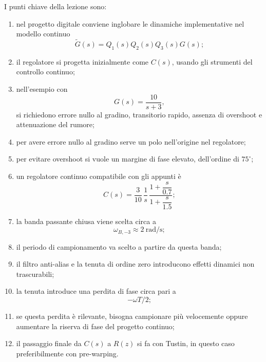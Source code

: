 I punti chiave della lezione sono:
\begin{enumerate}
    \item nel progetto digitale conviene inglobare le dinamiche implementative nel modello continuo
    \[
    \tilde G(s)=Q_1(s)Q_2(s)Q_3(s)G(s);
    \]
    \item il regolatore si progetta inizialmente come \(C(s)\), usando gli strumenti del controllo continuo;
    \item nell'esempio con
    \[
    G(s)=\frac{10}{s+3},
    \]
    si richiedono errore nullo al gradino, transitorio rapido, assenza di overshoot e attenuazione del rumore;
    \item per avere errore nullo al gradino serve un polo nell'origine nel regolatore;
    \item per evitare overshoot si vuole un margine di fase elevato, dell'ordine di \(75^\circ\);
    \item un regolatore continuo compatibile con gli appunti \`e
    \[
    C(s)=\frac{3}{10}\,\frac{1}{s}\,
    \frac{1+\dfrac{s}{0.7}}{1+\dfrac{s}{1.5}};
    \]
    \item la banda passante chiusa viene scelta circa a
    \[
    \omega_{B,-3}\approx 2\ \text{rad/s};
    \]
    \item il periodo di campionamento va scelto a partire da questa banda;
    \item il filtro anti-alias e la tenuta di ordine zero introducono effetti dinamici non trascurabili;
    \item la tenuta introduce una perdita di fase circa pari a
    \[
    -\omega T/2;
    \]
    \item se questa perdita \`e rilevante, bisogna campionare pi\`u velocemente oppure aumentare la riserva di fase del progetto continuo;
    \item il passaggio finale da \(C(s)\) a \(R(z)\) si fa con Tustin, in questo caso preferibilmente con pre-warping.
\end{enumerate}